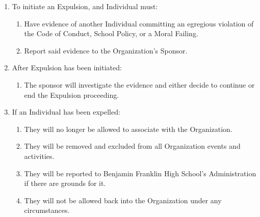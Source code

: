 \begin{enumerate}
	\item To initiate an Expulsion, and Individual must:
		\begin{enumerate}
			\item Have evidence of another Individual committing an egregious violation
				of the Code of Conduct, School Policy, or a Moral Failing.

			\item Report said evidence to the Organization's Sponsor.
		\end{enumerate}

	\item After Expulsion has been initiated:
		\begin{enumerate}
			\item The sponsor will investigate the evidence and either decide to continue
				or end the Expulsion proceeding.
		\end{enumerate}

	\item If an Individual has been expelled:
		\begin{enumerate}
			\item They will no longer be allowed to associate with the Organization.

			\item They will be removed and excluded from all Organization events and activities.

			\item They will be reported to Benjamin Franklin High School’s Administration
				if there are grounds for it.

			\item They will not be allowed back into the Organization under any circumstances.
		\end{enumerate}
\end{enumerate}